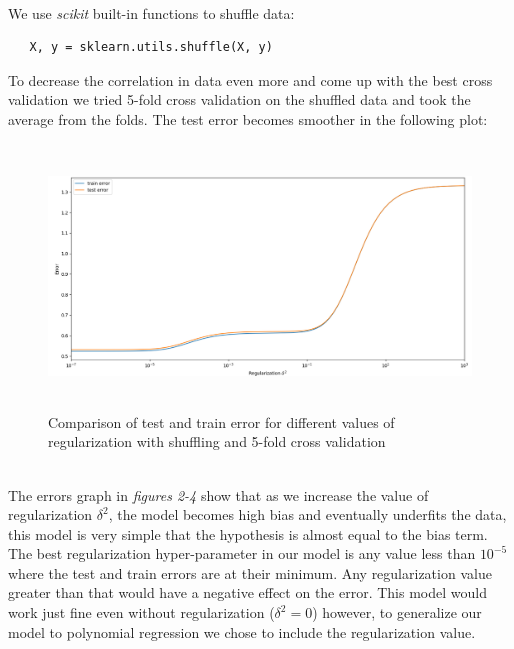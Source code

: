 \documentclass[a4paper,11pt]{article}
\begin{document}
\noindent
\\We use \textit{scikit} built-in functions to shuffle data:
\begin{verbatim}
   X, y = sklearn.utils.shuffle(X, y)
\end{verbatim}
To decrease the correlation in data even more and come up with the best cross validation we tried 5-fold cross validation on the shuffled data and took the average from the folds. The test error becomes smoother in the following plot:
\begin{figure}[!htb]
	\centering
	\includegraphics[width=15cm, height=7cm]{plotB_5fold.png}
	\caption{\small Comparison of test and train error for different values of regularization with shuffling and 5-fold cross validation}
\end{figure}
\noindent
\\The errors graph in \textit{figures 2-4} show that as we increase the value of regularization $\delta^2$, the model becomes high bias and eventually underfits the data, this model is very simple that the hypothesis is almost equal to the bias term. \\
The best regularization hyper-parameter in our model is any value less than $10^{-5}$ where the test and train errors are at their minimum. Any regularization value greater than that would have a negative effect on the error. This model would work just fine even without regularization ($\delta^2=0$) however, to generalize our model to polynomial regression we chose to include the regularization value. \\
\end{document}
